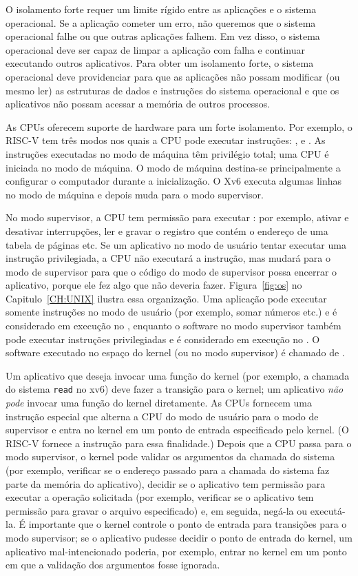 O isolamento forte requer um limite rígido entre as aplicações e o sistema operacional. 
Se a aplicação cometer um erro, não queremos que o sistema operacional
falhe ou que outras aplicações falhem. Em vez disso, o sistema operacional deve ser
capaz de limpar a aplicação com falha e continuar executando outros aplicativos.
Para obter um isolamento forte, o sistema operacional deve providenciar para que as aplicações não possam modificar (ou mesmo ler) as estruturas de dados e instruções do sistema operacional
e que os aplicativos não possam acessar a memória de outros processos.

As CPUs oferecem suporte de hardware para um forte isolamento.
Por exemplo, o RISC-V tem três modos nos quais a CPU pode executar instruções:
,
 e
.
As instruções executadas no modo de máquina têm privilégio total; uma CPU
é iniciada no modo de máquina. O modo de máquina destina-se principalmente a
configurar o computador durante a inicialização.
O Xv6 executa algumas linhas no modo de máquina e depois muda para o modo supervisor.

No modo supervisor, a CPU tem permissão para executar 
:
por exemplo, ativar e desativar interrupções, ler e gravar
o registro que contém o endereço de uma tabela de páginas etc.
Se um aplicativo no modo de usuário tentar executar
uma instrução privilegiada, a CPU não executará a instrução, mas mudará
para o modo de supervisor para que o código do modo de supervisor possa encerrar o aplicativo,
porque ele fez algo que não deveria fazer.
Figura~\ref{fig:os}
no Capitulo~\ref{CH:UNIX} ilustra essa organização. Uma aplicação pode
executar somente instruções no modo de usuário (por exemplo, somar números etc.) e é considerado
em execução no 
,
enquanto o software no modo supervisor também pode executar instruções privilegiadas e
é considerado em execução no
.
O software executado no espaço do kernel (ou no modo supervisor) é chamado de
.

Um aplicativo que deseja invocar uma função do kernel (por exemplo, a chamada do sistema
\lstinline{read}
no xv6) deve 
fazer a transição para o kernel; um aplicativo \emph{não pode} invocar uma função do kernel
diretamente. As CPUs fornecem uma instrução especial que alterna a CPU
do modo de usuário para o modo de supervisor e entra no kernel em um ponto de entrada
especificado pelo kernel. (O RISC-V
fornece a instrução 
para essa finalidade.) Depois que a CPU passa para o modo supervisor,
o kernel pode validar os argumentos da chamada do sistema (por exemplo,
verificar se o endereço passado para a chamada do sistema faz parte da memória do aplicativo), decidir se o aplicativo tem permissão para executar a operação solicitada (por exemplo,
verificar se o aplicativo tem permissão para gravar o arquivo especificado)
e, em seguida, negá-la ou executá-la. É importante que o kernel controle o ponto de entrada para
transições para o modo supervisor; se o aplicativo pudesse decidir o ponto de entrada do kernel, um aplicativo mal-intencionado poderia, por exemplo, entrar no kernel em um ponto em que a validação dos argumentos fosse ignorada.

